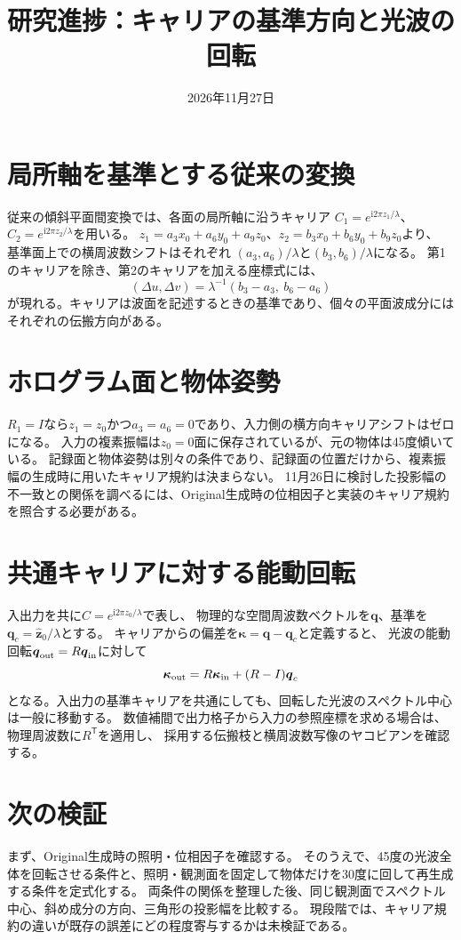 \documentclass[a4paper,10pt]{ltjsarticle}
\title{研究進捗：キャリアの基準方向と光波の回転}
\author{}
\date{2026年11月27日}
\begin{document}
\maketitle
\section{局所軸を基準とする従来の変換}
従来の傾斜平面間変換では、各面の局所軸に沿うキャリア
$C_1=e^{\mathrm{i}2\pi z_1/\lambda}$、$C_2=e^{\mathrm{i}2\pi z_2/\lambda}$を用いる。
$z_1=a_3x_0+a_6y_0+a_9z_0$、$z_2=b_3x_0+b_6y_0+b_9z_0$より、
基準面上での横周波数シフトはそれぞれ
$(a_3,a_6)/\lambda$と$(b_3,b_6)/\lambda$になる。
第1のキャリアを除き、第2のキャリアを加える座標式には、
\[
 (\Delta u,\Delta v)=\lambda^{-1}(b_3-a_3,\ b_6-a_6)
\]
が現れる。キャリアは波面を記述するときの基準であり、個々の平面波成分にはそれぞれの伝搬方向がある。

\section{ホログラム面と物体姿勢}
$R_1=I$なら$z_1=z_0$かつ$a_3=a_6=0$であり、入力側の横方向キャリアシフトはゼロになる。
入力の複素振幅は$z_0=0$面に保存されているが、元の物体は45度傾いている。
記録面と物体姿勢は別々の条件であり、記録面の位置だけから、複素振幅の生成時に用いたキャリア規約は決まらない。
11月26日に検討した投影幅の不一致との関係を調べるには、Original生成時の位相因子と実装のキャリア規約を照合する必要がある。

\section{共通キャリアに対する能動回転}
入出力を共に$C=e^{\mathrm{i}2\pi z_0/\lambda}$で表し、
物理的な空間周波数ベクトルを$\boldsymbol q$、基準を
$\boldsymbol q_c=\hat{\boldsymbol z}_0/\lambda$とする。
キャリアからの偏差を$\boldsymbol\kappa=\boldsymbol q-\boldsymbol q_c$と定義すると、
光波の能動回転$\boldsymbol q_{\rm out}=R\boldsymbol q_{\rm in}$に対して
\[
 \boldsymbol\kappa_{\rm out}
 =R\boldsymbol\kappa_{\rm in}+(R-I)\boldsymbol q_c
\]
となる。入出力の基準キャリアを共通にしても、回転した光波のスペクトル中心は一般に移動する。
数値補間で出力格子から入力の参照座標を求める場合は、物理周波数に$R^{\mathsf T}$を適用し、
採用する伝搬枝と横周波数写像のヤコビアンを確認する。

\section{次の検証}
まず、Original生成時の照明・位相因子を確認する。
そのうえで、45度の光波全体を回転させる条件と、照明・観測面を固定して物体だけを30度に回して再生成する条件を定式化する。
両条件の関係を整理した後、同じ観測面でスペクトル中心、斜め成分の方向、三角形の投影幅を比較する。
現段階では、キャリア規約の違いが既存の誤差にどの程度寄与するかは未検証である。
\end{document}
